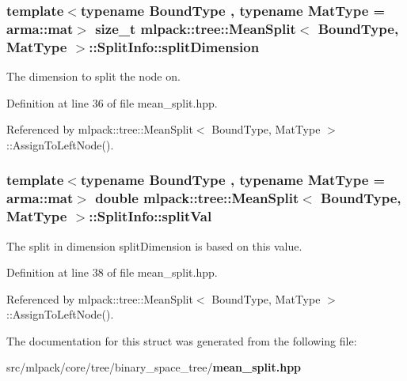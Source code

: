 \subsubsection[{split\+Dimension}]{\setlength{\rightskip}{0pt plus 5cm}template$<$typename Bound\+Type , typename Mat\+Type  = arma\+::mat$>$ size\+\_\+t {\bf mlpack\+::tree\+::\+Mean\+Split}$<$ Bound\+Type, Mat\+Type $>$\+::Split\+Info\+::split\+Dimension}\label{structmlpack_1_1tree_1_1MeanSplit_1_1SplitInfo_a3c5a79c2134835b1fe3be0baac0b2edc}


The dimension to split the node on. 



Definition at line 36 of file mean\+\_\+split.\+hpp.



Referenced by mlpack\+::tree\+::\+Mean\+Split$<$ Bound\+Type, Mat\+Type $>$\+::\+Assign\+To\+Left\+Node().

\subsubsection[{split\+Val}]{\setlength{\rightskip}{0pt plus 5cm}template$<$typename Bound\+Type , typename Mat\+Type  = arma\+::mat$>$ double {\bf mlpack\+::tree\+::\+Mean\+Split}$<$ Bound\+Type, Mat\+Type $>$\+::Split\+Info\+::split\+Val}\label{structmlpack_1_1tree_1_1MeanSplit_1_1SplitInfo_aeee251f5d8e7a14f9024a2714cf1cc0f}


The split in dimension split\+Dimension is based on this value. 



Definition at line 38 of file mean\+\_\+split.\+hpp.



Referenced by mlpack\+::tree\+::\+Mean\+Split$<$ Bound\+Type, Mat\+Type $>$\+::\+Assign\+To\+Left\+Node().



The documentation for this struct was generated from the following file\+:\begin{DoxyCompactItemize}
\item 
src/mlpack/core/tree/binary\+\_\+space\+\_\+tree/{\bf mean\+\_\+split.\+hpp}\end{DoxyCompactItemize}
